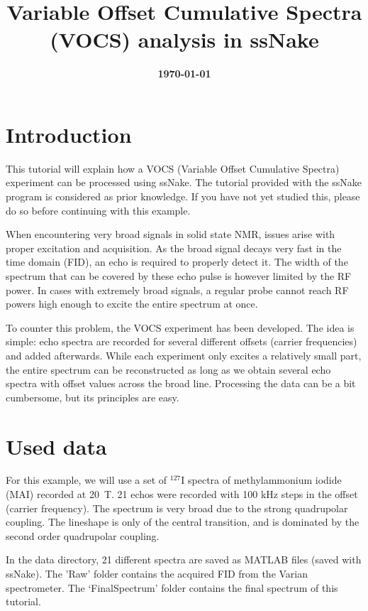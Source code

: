 \documentclass[11pt,a4paper]{article}
\title{\color{black}\fontfamily{SourceSansPro-LF}\bfseries Variable Offset Cumulative Spectra (VOCS)
analysis in ssNake}
\author{}
\date{\color{black}\fontfamily{SourceSansPro-LF}\bfseries \today}
\begin{document}

\maketitle

\section{Introduction}
This tutorial will explain how a VOCS (Variable Offset Cumulative Spectra) experiment can be processed using ssNake.
The tutorial provided with the ssNake program is considered as prior knowledge.
If you have not yet studied this, please do so before continuing with this example.

When encountering very broad signals in solid state NMR, issues arise with proper excitation and acquisition. As the broad signal decays very fast in the time domain (FID), an echo is required to properly detect it.
The width of the spectrum that can be covered by these echo pulse is however limited by the RF power.
In cases with extremely broad signals, a regular probe cannot reach RF powers high enough to excite the entire spectrum at once.

To counter this problem, the VOCS experiment has been developed.
The idea is simple: echo spectra are recorded for several different offsets (carrier frequencies) and added afterwards.
While each experiment only excites a relatively small part, the entire spectrum can be reconstructed as long as we obtain several echo spectra with offset values across the broad line.
Processing the data can be a bit cumbersome, but its principles are easy.

\section{Used data}
For this example, we will use a set of $^{127}$I spectra of methylammonium iodide (MAI) recorded at 20~T.
21 echos were recorded with 100 kHz steps in the offset (carrier frequency).
The spectrum is very broad due to the strong quadrupolar coupling.
The lineshape is only of the central transition, and is dominated by the second order quadrupolar coupling.

In the data directory, 21 different spectra are saved as MATLAB files (saved with ssNake).
The 'Raw' folder contains the acquired FID from the Varian spectrometer.
The `FinalSpectrum' folder contains the final spectrum of this tutorial.
\end{document}
